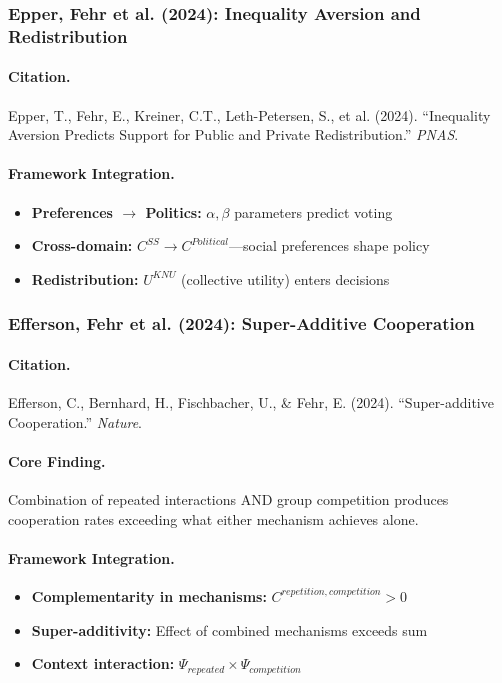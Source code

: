 \documentclass[12pt,a4paper]{article}
\begin{document}
\subsubsection{Epper, Fehr et al. (2024): Inequality Aversion and Redistribution}

\paragraph{Citation.}
Epper, T., Fehr, E., Kreiner, C.T., Leth-Petersen, S., et al. (2024).
``Inequality Aversion Predicts Support for Public and Private Redistribution.''
\emph{PNAS}.

\paragraph{Framework Integration.}
\begin{itemize}
  \item \textbf{Preferences $\to$ Politics:} $\alpha, \beta$ parameters predict voting
  \item \textbf{Cross-domain:} $C^{SS} \to C^{Political}$---social preferences shape policy
  \item \textbf{Redistribution:} $U^{KNU}$ (collective utility) enters decisions
\end{itemize}

\subsubsection{Efferson, Fehr et al. (2024): Super-Additive Cooperation}

\paragraph{Citation.}
Efferson, C., Bernhard, H., Fischbacher, U., \& Fehr, E. (2024).
``Super-additive Cooperation.'' \emph{Nature}.

\paragraph{Core Finding.}
Combination of repeated interactions AND group competition produces
cooperation rates exceeding what either mechanism achieves alone.

\paragraph{Framework Integration.}
\begin{itemize}
  \item \textbf{Complementarity in mechanisms:} $C^{repetition, competition} > 0$
  \item \textbf{Super-additivity:} Effect of combined mechanisms exceeds sum
  \item \textbf{Context interaction:} $\Psi_{repeated} \times \Psi_{competition}$
\end{itemize}
\end{document}
